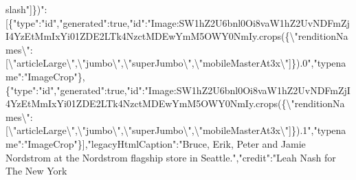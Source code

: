 slash{}"{]}\})":{[}\{"type":"id","generated":true,"id":"Image:SW1hZ2U6bnl0Oi8vaW1hZ2UvNDFmZjI4YzEtMmIxYi01ZDE2LTk4NzctMDEwYmM5OWY0NmIy.crops(\{\textbackslash{}"renditionNames\textbackslash{}":{[}\textbackslash{}"articleLarge\textbackslash{}",\textbackslash{}"jumbo\textbackslash{}",\textbackslash{}"superJumbo\textbackslash{}",\textbackslash{}"mobileMasterAt3x\textbackslash{}"{]}\}).0","typename":"ImageCrop"\},\{"type":"id","generated":true,"id":"Image:SW1hZ2U6bnl0Oi8vaW1hZ2UvNDFmZjI4YzEtMmIxYi01ZDE2LTk4NzctMDEwYmM5OWY0NmIy.crops(\{\textbackslash{}"renditionNames\textbackslash{}":{[}\textbackslash{}"articleLarge\textbackslash{}",\textbackslash{}"jumbo\textbackslash{}",\textbackslash{}"superJumbo\textbackslash{}",\textbackslash{}"mobileMasterAt3x\textbackslash{}"{]}\}).1","typename":"ImageCrop"\}{]},"legacyHtmlCaption":"Bruce,
Erik, Peter and Jamie Nordstrom at the Nordstrom flagship store in
Seattle.","credit":"Leah Nash for The New York
